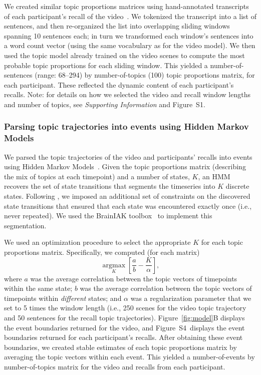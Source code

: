 \documentclass{article}
\newcommand{\argmax}{\mathop{\mathrm{argmax}}\limits}
\newcommand{\topicopt}{S1}
\newcommand{\corrmats}{S4}
\begin{document}
We created similar topic proportions matrices using hand-annotated transcripts of each participant's recall of the video~\citep[annotated by ][]{ChenEtal17}.  We tokenized the transcript into a list of sentences, and then re-organized the list into overlapping sliding windows spanning 10 sentences each; in turn we transformed each window's sentences into a word count vector (using the same vocabulary as for the video model).  We then used the topic model already trained on the video scenes to compute the most probable topic proportions for each sliding window.  This yielded a number-of-sentences (range: 68--294) by number-of-topics (100) topic proportions matrix, for each participant.  These reflected the dynamic content of each participant's recalls.  Note: for details on how we selected the video and recall window lengths and number of topics, see \textit{Supporting Information} and Figure~\topicopt.

\subsubsection*{Parsing topic trajectories into events using Hidden Markov Models}
We parsed the topic trajectories of the video and participants' recalls into events using Hidden Markov Models~\citep{Rabi89}.  Given the topic proportions matrix (describing the mix of topics at each timepoint) and a number of states, $K$, an HMM recovers the set of state transitions that segments the timeseries into $K$ discrete states.  Following \cite{BaldEtal17}, we imposed an additional set of constraints on the discovered state transitions that ensured that each state was encountered exactly once (i.e., never repeated).  We used the BrainIAK toolbox~\citep{Brainiak} to implement this segmentation.

We used an optimization procedure to select the appropriate $K$ for each topic proportions matrix.  Specifically, we computed (for each matrix)
\[
  \argmax_K \left[\frac{a}{b} - \frac{K}{\alpha}\right],
\]
where $a$ was the average correlation between the topic vectors of timepoints within the same state; $b$ was the average correlation between the topic vectors of timepoints within \textit{different} states; and $\alpha$ was a regularization parameter that we set to 5 times the window length (i.e., 250 scenes for the video topic trajectory and 50 sentences for the recall topic trajectories).  Figure~\ref{fig:model}B displays the event boundaries returned for the video, and Figure~\corrmats~displays the event boundaries returned for each participant's recalls.  After obtaining these event boundaries, we created stable estimates of each topic proportions matrix by averaging the topic vectors within each event.  This yielded a number-of-events by number-of-topics matrix for the video and recalls from each participant.
\end{document}
